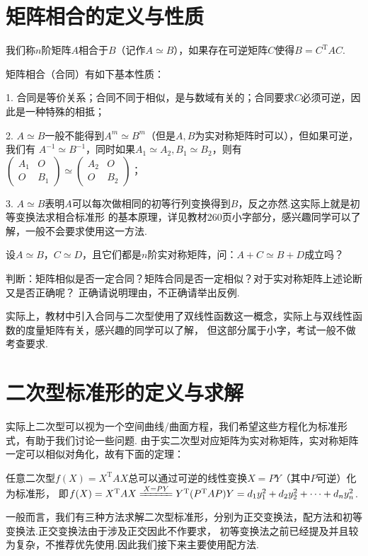 \section{矩阵相合的定义与性质}
\begin{definition}
	我们称$n$阶矩阵$A$相合于$B$（记作$A\simeq B$），如果存在可逆矩阵$C$使得$B=C^\mathrm{T}AC$.
\end{definition}
矩阵相合（合同）有如下基本性质：

1. 合同是等价关系；合同不同于相似，是与数域有关的；合同要求$C$必须可逆，因此是一种特殊的相抵；

2. $A\simeq B$一般不能得到$A^m\simeq B^m$（但是$A,B$为实对称矩阵时可以），但如果可逆，我们有
$A^{-1}\simeq B^{-1}$，同时如果$A_1\simeq A_2,B_1\simeq B_2$，则有$\begin{pmatrix}
	A_1 & O \\ O & B_1
\end{pmatrix}\simeq\begin{pmatrix}
	A_2 & O \\ O & B_2
\end{pmatrix}$；

3. $A\simeq B$表明$A$可以每次做相同的初等行列变换得到$B$，反之亦然.这实际上就是初等变换法求相合标准形
的基本原理，详见教材260页小字部分，感兴趣同学可以了解，一般不会要求使用这一方法.

\begin{example}
	设$A\simeq B$，$C\simeq D$，且它们都是$n$阶实对称矩阵，问：$A+C\simeq B+D$成立吗？
\end{example}
\begin{example}
	判断：矩阵相似是否一定合同？矩阵合同是否一定相似？对于实对称矩阵上述论断又是否正确呢？
	正确请说明理由，不正确请举出反例.
\end{example}
实际上，教材中引入合同与二次型使用了双线性函数这一概念，实际上与双线性函数的度量矩阵有关，感兴趣的同学可以了解，
但这部分属于小字，考试一般不做考查要求.

\section{二次型标准形的定义与求解}
实际上二次型可以视为一个空间曲线/曲面方程，我们希望这些方程化为标准形式，有助于我们讨论一些问题.
由于实二次型对应矩阵为实对称矩阵，实对称矩阵一定可以相似对角化，故有下面的定理：
\begin{theorem}
	任意二次型$f(X)=X^\mathrm{T}AX$总可以通过可逆的线性变换$X=PY$（其中$P$可逆）化为标准形，
	即$f(X)=X^\mathrm{T}AX\xlongequal{X=PY}Y^\mathrm{T}(P^\mathrm{T}AP)Y=d_1y_1^2+d_2y_2^2+\cdots+d_ny_n^2$.
\end{theorem}
一般而言，我们有三种方法求解二次型标准形，分别为正交变换法，配方法和初等变换法.正交变换法由于涉及正交因此不作要求，
初等变换法之前已经提及并且较为复杂，不推荐优先使用.因此我们接下来主要使用配方法.


